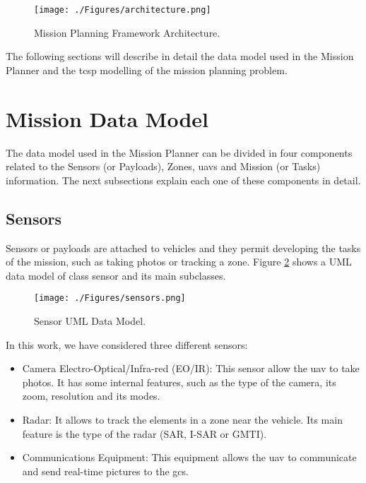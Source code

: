 \begin{figure}[h]
\centering
\texttt{[image: ./Figures/architecture.png]}
\caption{Mission Planning Framework Architecture.}
\label{fig:framework}
\end{figure}

The following sections will describe in detail the data model used in the Mission Planner and the \gls{tcsp} modelling of the mission planning problem.

\section{Mission Data Model}\label{datamodel}
The data model used in the Mission Planner can be divided in four components related to the Sensors (or Payloads), Zones, \glspl{uav} and Mission (or Tasks) information. The next subsections explain each one of these components in detail.


\subsection{Sensors}
Sensors or payloads are attached to vehicles and they permit developing the tasks of the mission, such as taking photos or tracking a zone. Figure \ref{fig:sensor} shows a UML data model of class sensor and its main subclasses.

\begin{figure}[h]
\centering
\texttt{[image: ./Figures/sensors.png]}
\caption{Sensor UML Data Model.}
\label{fig:sensor}
\end{figure}

In this work, we have considered three different sensors:

\begin{itemize}

\item Camera Electro-Optical/Infra-red (EO/IR): This sensor allow the \gls{uav} to take photos. It has some internal features, such as the type of the camera, its zoom, resolution and its modes.

\item Radar: It allows to track the elements in a zone near the vehicle. Its main feature is the type of the radar (SAR, I-SAR or GMTI).

\item Communications Equipment: This equipment allows the \gls{uav} to communicate and send real-time pictures to the \gls{gcs}.

\end{itemize}


